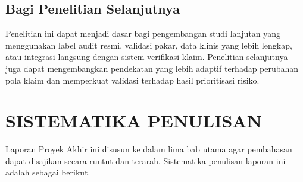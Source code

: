 \subsection{Bagi Penelitian Selanjutnya}

Penelitian ini dapat menjadi dasar bagi pengembangan studi lanjutan yang menggunakan label audit resmi, validasi pakar, data klinis yang lebih lengkap, atau integrasi langsung dengan sistem verifikasi klaim. Penelitian selanjutnya juga dapat mengembangkan pendekatan yang lebih adaptif terhadap perubahan pola klaim dan memperkuat validasi terhadap hasil prioritisasi risiko.

\section{SISTEMATIKA PENULISAN}

Laporan Proyek Akhir ini disusun ke dalam lima bab utama agar pembahasan dapat disajikan secara runtut dan terarah. Sistematika penulisan laporan ini adalah sebagai berikut.

